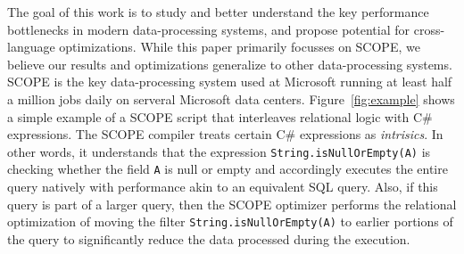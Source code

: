 The goal of this work is to study and better understand the key performance bottlenecks in modern data-processing systems, and propose potential for cross-language optimizations. While this paper primarily focusses on SCOPE, we believe our results and optimizations generalize to other data-processing systems. 
SCOPE is the key data-processing system used at Microsoft running at least half a million jobs daily on serveral Microsoft data centers. 
Figure~\ref{fig:example} shows a simple example of a SCOPE script that interleaves relational logic with C\# expressions. The SCOPE compiler 
treats certain C\# expressions as {\em intrisics}. In other words, it understands that the expression {\tt String.isNullOrEmpty(A)} is checking whether the field {\tt A} is null or empty and accordingly executes the entire query natively with performance akin to an equivalent SQL query. Also, if this query is part of a larger query, then the SCOPE optimizer performs the relational optimization of moving the filter {\tt String.isNullOrEmpty(A)} to earlier portions of the query to significantly reduce the data processed during the execution.






